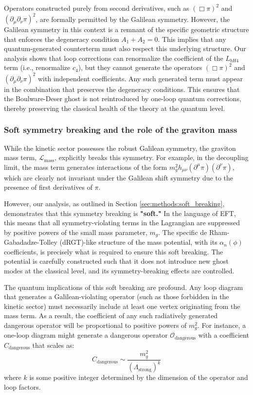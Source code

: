 \documentclass[twocolumn]{aastex631}
\begin{document}
Operators constructed purely from second derivatives, such as $(\Box\pi)^2$ and $(\partial_\mu\partial_\nu\pi)^2$, are formally permitted by the Galilean symmetry. However, the Galilean symmetry in this context is a remnant of the specific geometric structure that enforces the degeneracy condition $A_1+A_2=0$. This implies that any quantum-generated counterterm must also respect this underlying structure. Our analysis shows that loop corrections can renormalize the coefficient of the $L_{bH4}$ term (i.e., renormalize $c_4$), but they cannot generate the operators $(\Box\pi)^2$ and $(\partial_\mu\partial_\nu\pi)^2$ with independent coefficients. Any such generated term must appear in the combination that preserves the degeneracy conditions. This ensures that the Boulware-Deser ghost is not reintroduced by one-loop quantum corrections, thereby preserving the classical health of the theory at the quantum level.

\subsubsection{Soft symmetry breaking and the role of the graviton mass}
While the kinetic sector possesses the robust Galilean symmetry, the graviton mass term, $\mathcal{L}_{\text{mass}}$, explicitly breaks this symmetry. For example, in the decoupling limit, the mass term generates interactions of the form $m_g^2 h_{\mu\nu} (\partial^\mu \pi) (\partial^\nu \pi)$, which are clearly not invariant under the Galilean shift symmetry due to the presence of first derivatives of $\pi$.

However, our analysis, as outlined in Section \ref{sec:methods:soft_breaking}, demonstrates that this symmetry breaking is \textbf{"soft."} In the language of EFT, this means that all symmetry-violating terms in the Lagrangian are suppressed by positive powers of the small mass parameter, $m_g$. The specific de Rham-Gabadadze-Tolley (dRGT)-like structure of the mass potential, with its $\alpha_n(\phi)$ coefficients, is precisely what is required to ensure this soft breaking. The potential is carefully constructed such that it does not introduce new ghost modes at the classical level, and its symmetry-breaking effects are controlled.

The quantum implications of this soft breaking are profound. Any loop diagram that generates a Galilean-violating operator (such as those forbidden in the kinetic sector) must necessarily include at least one vertex originating from the mass term. As a result, the coefficient of any such radiatively generated dangerous operator will be proportional to positive powers of $m_g^2$. For instance, a one-loop diagram might generate a dangerous operator $\mathcal{O}_{\text{dangerous}}$ with a coefficient $C_{\text{dangerous}}$ that scales as:
\begin{equation*}
C_{\text{dangerous}} \sim \frac{m_g^2}{(\Lambda_{\text{strong}})^k}
\end{equation*}
where $k$ is some positive integer determined by the dimension of the operator and loop factors.
\end{document}
